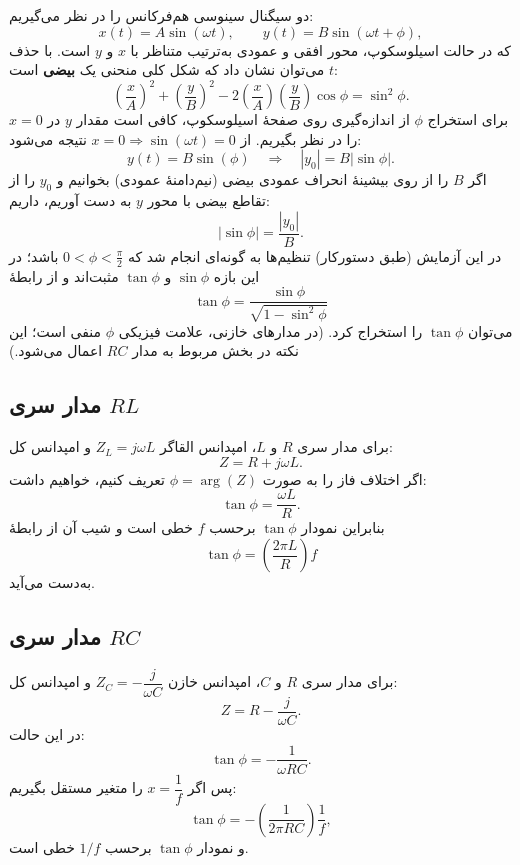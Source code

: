 \documentclass[a4paper, 11pt]{article}
\begin{document}
دو سیگنال سینوسی هم‌فرکانس را در نظر می‌گیریم:
\[
x(t)=A\sin(\omega t),\qquad y(t)=B\sin(\omega t+\phi),
\]
که در حالت  اسیلوسکوپ، محور افقی و عمودی به‌ترتیب متناظر با \(x\) و \(y\) است. با حذف \(t\) می‌توان نشان داد که شکل کلی منحنی یک \textbf{بیضی} است:
\begin{equation}
\left(\frac{x}{A}\right)^2+\left(\frac{y}{B}\right)^2-2\left(\frac{x}{A}\right)\left(\frac{y}{B}\right)\cos\phi=\sin^2\phi.
\label{eq:lissajous_ellipse}
\end{equation}
برای استخراج \(\phi\) از اندازه‌گیری روی صفحهٔ اسیلوسکوپ، کافی است مقدار \(y\) در \(x=0\) را در نظر بگیریم. از \(x=0\Rightarrow \sin(\omega t)=0\) نتیجه می‌شود:
\[
y(t)=B\sin(\phi)\quad\Rightarrow\quad |y_0|=B|\sin\phi|.
\]
اگر \(B\) را از روی بیشینهٔ انحراف عمودی بیضی (نیم‌دامنهٔ عمودی) بخوانیم و \(y_0\) را از تقاطع بیضی با محور \(y\) به دست آوریم، داریم:
\begin{equation}
|\sin\phi|=\frac{|y_0|}{B}.
\label{eq:sinphi_from_screen}
\end{equation}
در این آزمایش (طبق دستورکار) تنظیم‌ها به گونه‌ای انجام شد که \(0<\phi<\frac{\pi}{2}\) باشد؛ در این بازه \(\sin\phi\) و \(\tan\phi\) مثبت‌اند و از رابطهٔ
\begin{equation}
\tan\phi=\frac{\sin\phi}{\sqrt{1-\sin^2\phi}}
\label{eq:tan_from_sin}
\end{equation}
می‌توان \(\tan\phi\) را استخراج کرد. (در مدارهای خازنی، علامت فیزیکی \(\phi\) منفی است؛ این نکته در بخش مربوط به مدار $RC$ اعمال می‌شود.)

\subsection{مدار سری $RL$}

برای مدار سری \(R\) و \(L\)، امپدانس القاگر \(Z_L=j\omega L\) و امپدانس کل:
\[
Z=R+j\omega L.
\]
اگر اختلاف فاز را به صورت \(\phi=\arg(Z)\) تعریف کنیم، خواهیم داشت:
\begin{equation}
\tan\phi=\frac{\omega L}{R}.
\label{eq:tanphi_RL}
\end{equation}
بنابراین نمودار \(\tan\phi\) برحسب \(f\) خطی است و شیب آن از رابطهٔ
\[
\tan\phi=\left(\frac{2\pi L}{R}\right)f
\]
به‌دست می‌آید.

\subsection{مدار سری $RC$}

برای مدار سری \(R\) و \(C\)، امپدانس خازن \(Z_C=-\dfrac{j}{\omega C}\) و امپدانس کل:
\[
Z=R-\frac{j}{\omega C}.
\]
در این حالت:
\begin{equation}
\tan\phi=-\frac{1}{\omega RC}.
\label{eq:tanphi_RC}
\end{equation}
پس اگر \(x=\dfrac{1}{f}\) را متغیر مستقل بگیریم:
\[
\tan\phi=-\left(\frac{1}{2\pi RC}\right)\frac{1}{f},
\]
و نمودار \(\tan\phi\) برحسب \(1/f\) خطی است.
\end{document}
